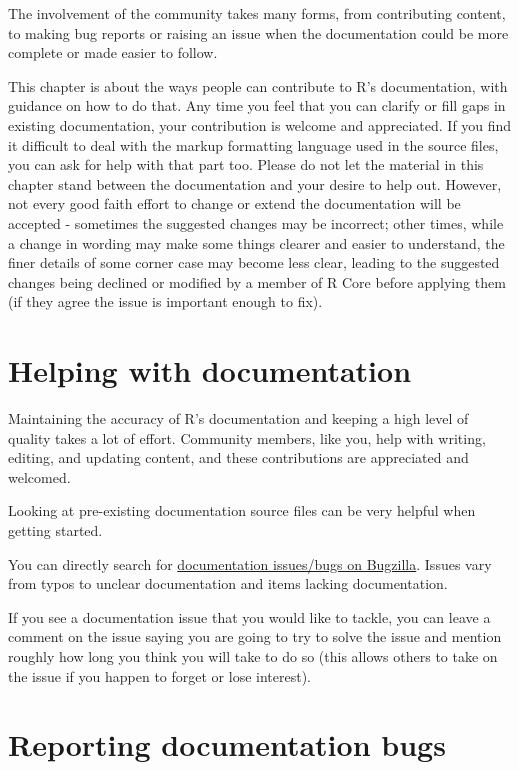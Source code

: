 \documentclass[
]{book}
\begin{document}
The involvement of the community takes many forms, from contributing content, to making bug reports or raising an issue when the documentation could be more complete or made easier to follow.

This chapter is about the ways people can contribute to R's documentation, with guidance on how to do that. Any time you feel that you can clarify or fill gaps in existing documentation, your contribution is welcome and appreciated. If you find it difficult to deal with the markup formatting language used in the source files, you can ask for help with that part too. Please do not let the material in this chapter stand between the documentation and your desire to help out. However, not every good faith effort to change or extend the documentation will be accepted - sometimes the suggested changes may be incorrect; other times, while a change in wording may make some things clearer and easier to understand, the finer details of some corner case may become less clear, leading to the suggested changes being declined or modified by a member of R Core before applying them (if they agree the issue is important enough to fix).

\section{Helping with documentation}\label{helping-with-documentation}

Maintaining the accuracy of R's documentation and keeping a high level of quality takes a lot of effort. Community members, like you, help with writing, editing, and updating content, and these contributions are appreciated and welcomed.

Looking at pre-existing documentation source files can be very helpful when getting started.

You can directly search for \href{https://bugs.r-project.org/buglist.cgi?component=Documentation&list_id=22501&product=R&resolution=---}{documentation issues/bugs on Bugzilla}. Issues vary from typos to unclear documentation and items lacking documentation.

If you see a documentation issue that you would like to tackle, you can leave a comment on the issue saying you are going to try to solve the issue and mention roughly how long you think you will take to do so (this allows others to take on the issue if you happen to forget or lose interest).

\section{Reporting documentation bugs}\label{reporting-documentation-bugs}
\end{document}
